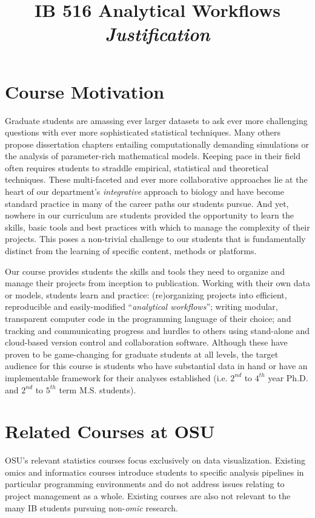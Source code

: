 \documentclass[10pt]{article}
\title{IB 516 Analytical Workflows\\\emph{Justification}}
\date{}
\begin{document}
\maketitle

\section*{Course Motivation}
Graduate students are amassing ever larger datasets to ask ever more challenging questions with ever 
more sophisticated  statistical techniques. 
Many others propose dissertation chapters entailing computationally demanding simulations or the 
analysis of parameter-rich mathematical models. 
Keeping pace in their field often requires students to straddle empirical, statistical and theoretical 
techniques. 
These multi-faceted and ever more collaborative approaches lie at the heart of our 
department's \emph{integrative} approach to biology and have become standard practice in many of the 
career paths our students pursue.
And yet, nowhere in our curriculum are students provided the opportunity to learn the skills, basic tools 
and best practices with which to manage the complexity of their projects.
This poses a non-trivial challenge to our students that is fundamentally distinct from the learning of 
specific content, methods or platforms.

Our course provides students the skills and tools they need to organize and manage their projects from 
inception to publication.  
Working with their own data or models, students learn and practice: (re)organizing projects into 
efficient, reproducible and easily-modified ``\emph{analytical workflows}''; 
writing modular, transparent computer code in the programming language of their choice;
and tracking and communicating progress and hurdles to others using stand-alone and cloud-based 
version control and collaboration software.
Although these have proven to be game-changing for graduate students at all levels, the 
target audience for this course is students who have substantial data in hand or have an 
implementable framework for their analyses established (i.e. $2^{nd}$ to $4^{th}$ year Ph.D. and 
$2^{nd}$ to $5^{th}$ term M.S. students).


\section*{Related Courses at OSU}
OSU's relevant statistics courses focus exclusively on data visualization.
Existing omics and informatics courses introduce students to specific analysis 
pipelines in particular programming environments and do not address issues relating to project 
management as a whole.
Existing courses are also not relevant to the many IB students pursuing non-\emph{omic} research.
\end{document}
